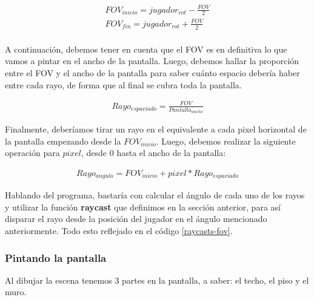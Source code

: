 \clearpage

\begin{equation}
\begin{aligned}
\label{foveq}
FOV_{inicio} = jugador_{rot} - \frac{FOV}{2}\\
FOV_{fin} = jugador_{rot} + \frac{FOV}{2} \\
\end{aligned}
\end{equation}

A continuación, debemos tener en cuenta que el FOV es en definitiva lo que vamos a pintar en el ancho de la pantalla. Luego, debemos hallar la proporción entre el FOV y el ancho de la pantalla para saber cuánto espacio debería haber entre cada rayo, de forma que al final se cubra toda la pantalla.

\begin{equation}
\begin{aligned}
\label{foveq}
Rayo_{espaciado} = \frac{FOV}{Pantalla_{ancho}}
\end{aligned}
\end{equation}

Finalmente, deberíamos tirar un rayo en el equivalente a cada pixel horizontal de la pantalla empezando desde la $FOV_{inicio}$. Luego, debemos realizar la siguiente operación para $pixel$, desde 0 hasta el ancho de la pantalla:

\begin{equation}
\begin{aligned}
\label{eq-rayo}
Rayo_{angulo} = FOV_{inicio} + pixel * Rayo_{espaciado} 
\end{aligned}
\end{equation}

Hablando del programa, bastaría con calcular el ángulo de cada uno de los rayos y utilizar la función \textbf{raycast} que definimos en la sección anterior, para así disparar el rayo desde la posición del jugador en el ángulo mencionado anteriormente. Todo esto reflejado en el código \ref{raycasts-fov}.



\subsubsection{Pintando la pantalla}


Al dibujar la escena tenemos 3 partes en la pantalla, a saber: el techo, el piso y el muro.

